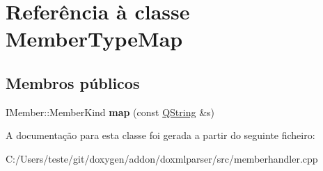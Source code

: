 \hypertarget{class_member_type_map}{\section{Referência à classe Member\-Type\-Map}
\label{class_member_type_map}
}
\subsection*{Membros públicos}
\begin{DoxyCompactItemize}
\item 
\hypertarget{class_member_type_map_ac3db3e87c7b5d9c8e53d2a1ac36c4a2d}{I\-Member\-::\-Member\-Kind {\bfseries map} (const \hyperlink{class_q_string}{Q\-String} \&s)}\label{class_member_type_map_ac3db3e87c7b5d9c8e53d2a1ac36c4a2d}

\end{DoxyCompactItemize}


A documentação para esta classe foi gerada a partir do seguinte ficheiro\-:\begin{DoxyCompactItemize}
\item 
C\-:/\-Users/teste/git/doxygen/addon/doxmlparser/src/memberhandler.\-cpp\end{DoxyCompactItemize}

